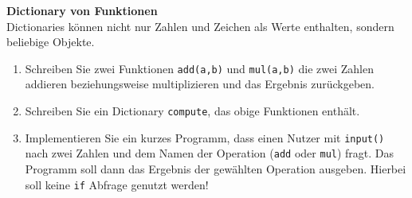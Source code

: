 \textbf{Dictionary von Funktionen}\\
Dictionaries können nicht nur Zahlen und Zeichen als Werte enthalten, sondern beliebige Objekte.
\begin{enumerate}
	\item Schreiben Sie zwei Funktionen \verb|add(a,b)| und \verb|mul(a,b)| die zwei Zahlen addieren beziehungsweise multiplizieren und das Ergebnis zurückgeben.
	\item Schreiben Sie ein Dictionary \verb|compute|, das obige Funktionen enthält.
	\item Implementieren Sie ein kurzes Programm, dass einen Nutzer mit \verb|input()| nach zwei Zahlen und dem Namen der Operation (\verb|add| oder \verb|mul|) fragt. Das Programm soll dann das Ergebnis der gewählten Operation ausgeben. Hierbei soll keine \verb|if| Abfrage genutzt werden!
\end{enumerate}